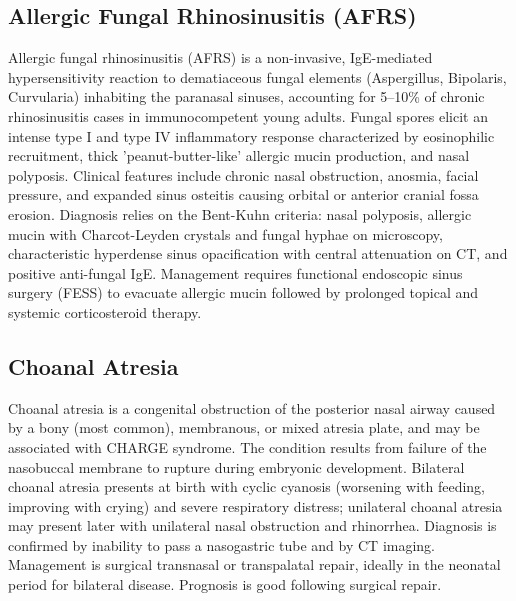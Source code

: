 






\label{sec:Structural Disorders}

\subsection{Allergic Fungal Rhinosinusitis (AFRS)}
\label{sec:Allergic Fungal Rhinosinusitis (AFRS)}
Allergic fungal rhinosinusitis (AFRS) is a non-invasive, IgE-mediated hypersensitivity reaction to dematiaceous fungal elements (Aspergillus, Bipolaris, Curvularia) inhabiting the paranasal sinuses, accounting for 5--10\% of chronic rhinosinusitis cases in immunocompetent young adults. Fungal spores elicit an intense type I and type IV inflammatory response characterized by eosinophilic recruitment, thick 'peanut-butter-like' allergic mucin production, and nasal polyposis. Clinical features include chronic nasal obstruction, anosmia, facial pressure, and expanded sinus osteitis causing orbital or anterior cranial fossa erosion. Diagnosis relies on the Bent-Kuhn criteria: nasal polyposis, allergic mucin with Charcot-Leyden crystals and fungal hyphae on microscopy, characteristic hyperdense sinus opacification with central attenuation on CT, and positive anti-fungal IgE. Management requires functional endoscopic sinus surgery (FESS) to evacuate allergic mucin followed by prolonged topical and systemic corticosteroid therapy.

\subsection{Choanal Atresia}
\label{sec:Choanal Atresia}
Choanal atresia is a congenital obstruction of the posterior nasal airway caused by a bony (most common), membranous, or mixed atresia plate, and may be associated with CHARGE syndrome. The condition results from failure of the nasobuccal membrane to rupture during embryonic development. Bilateral choanal atresia presents at birth with cyclic cyanosis (worsening with feeding, improving with crying) and severe respiratory distress; unilateral choanal atresia may present later with unilateral nasal obstruction and rhinorrhea. Diagnosis is confirmed by inability to pass a nasogastric tube and by CT imaging. Management is surgical transnasal or transpalatal repair, ideally in the neonatal period for bilateral disease. Prognosis is good following surgical repair.

